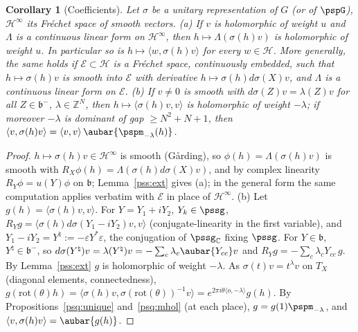 \documentclass[10pt]{amsart}
\newtheorem{corollary}[theorem]{Corollary}
\theoremstyle{definition}
\theoremstyle{remark}
\newcommand{\C}{\mathbb C}
\newcommand{\Z}{\mathbb Z}
\begin{document}
\begin{corollary}[Coefficients]\label{pss:coefs}
Let $\sigma$ be a unitary representation of $G$ (or of $\pspG$), $\mathcal H^\infty$ its Fr\'echet space of
smooth vectors.
\textup{(a)} If $v$ is holomorphic of weight $u$ and $\Lambda$ is a continuous linear form on
$\mathcal H^\infty$, then $h\mapsto\Lambda(\sigma(h)v)$ is holomorphic of weight $u$. In particular so is
$h\mapsto\langle w,\sigma(h)v\rangle$ for every $w\in\mathcal H$. More generally, the same holds if
$\mathcal E\subset\mathcal H$ is a Fr\'echet space, continuously embedded, such that $h\mapsto\sigma(h)v$ is smooth
into $\mathcal E$ with derivative $h\mapsto\sigma(h)d\sigma(X)v$, and $\Lambda$ is a continuous linear form on $\mathcal E$.
\textup{(b)} If $v\ne0$ is smooth with $d\sigma(Z)v=\lambda(Z)v$ for all $Z\in\mathfrak b^-$, $\lambda\in\Z^N$, then
$h\mapsto\langle\sigma(h)v,v\rangle$ is holomorphic of weight $-\lambda$; if moreover $-\lambda$ is dominant of gap
$\ge N^2+N+1$, then $\langle v,\sigma(h)v\rangle=\langle v,v\rangle\,\aubar{\pspm_{-\lambda}(h)}$.
\end{corollary}
\begin{proof}
$h\mapsto\sigma(h)v\in\mathcal H^\infty$ is smooth (G\aa rding), so $\phi(h)=\Lambda(\sigma(h)v)$ is smooth with
$R_X\phi(h)=\Lambda(\sigma(h)d\sigma(X)v)$, and by complex linearity $R_Y\phi=u(Y)\phi$ on $\mathfrak b$;
Lemma~\ref{pss:ext} gives (a); in the general form the same computation applies verbatim with $\mathcal E$
in place of $\mathcal H^\infty$. (b) Let $g(h)=\langle\sigma(h)v,v\rangle$. For $Y=Y_1+iY_2$, $Y_k\in\pssg$,
$R_Yg=\langle\sigma(h)d\sigma(Y_1-iY_2)v,v\rangle$ (conjugate-linearity in the first variable), and $Y_1-iY_2=
Y^\natural:=-\varepsilon Y^*\varepsilon$, the conjugation of $\pssg_\C$ fixing $\pssg$. For $Y\in\mathfrak b$,
$Y^\natural\in\mathfrak b^-$, so $d\sigma(Y^\natural)v=\lambda(Y^\natural)v=-\sum_c\lambda_c\aubar{Y_{cc}}v$ and
$R_Yg=-\sum_c\lambda_cY_{cc}\,g$. By Lemma~\ref{pss:ext} $g$ is holomorphic of weight $-\lambda$. As $\sigma(t)v=t^\lambda v$
on $T_X$ (diagonal elements, connectedness), $g(\mathrm{rot}(\theta)h)=\langle\sigma(h)v,\sigma(\mathrm{rot}(\theta))^{-1}v\rangle
=e^{2\pi i\theta\langle o,-\lambda\rangle}g(h)$. By Propositions~\ref{psq:unique} and~\ref{psq:mhol} (at each place),
$g=g(1)\pspm_{-\lambda}$, and $\langle v,\sigma(h)v\rangle=\aubar{g(h)}$.
\end{proof}
\end{document}
